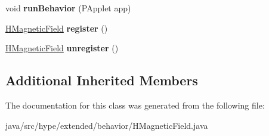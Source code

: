 \begin{DoxyCompactItemize}
\item 
\hypertarget{classhype_1_1extended_1_1behavior_1_1_h_magnetic_field_aa228747ff08e7e9c3382c6382b5a6bd2}{void {\bfseries run\-Behavior} (P\-Applet app)}\label{classhype_1_1extended_1_1behavior_1_1_h_magnetic_field_aa228747ff08e7e9c3382c6382b5a6bd2}

\item 
\hypertarget{classhype_1_1extended_1_1behavior_1_1_h_magnetic_field_a83f23f17e64fd42e8aaccae91dc63b6a}{\hyperlink{classhype_1_1extended_1_1behavior_1_1_h_magnetic_field}{H\-Magnetic\-Field} {\bfseries register} ()}\label{classhype_1_1extended_1_1behavior_1_1_h_magnetic_field_a83f23f17e64fd42e8aaccae91dc63b6a}

\item 
\hypertarget{classhype_1_1extended_1_1behavior_1_1_h_magnetic_field_a6af9c6b98cb6b1afbb63d1d64dc6a993}{\hyperlink{classhype_1_1extended_1_1behavior_1_1_h_magnetic_field}{H\-Magnetic\-Field} {\bfseries unregister} ()}\label{classhype_1_1extended_1_1behavior_1_1_h_magnetic_field_a6af9c6b98cb6b1afbb63d1d64dc6a993}

\end{DoxyCompactItemize}
\subsection*{Additional Inherited Members}


The documentation for this class was generated from the following file\-:\begin{DoxyCompactItemize}
\item 
java/src/hype/extended/behavior/H\-Magnetic\-Field.\-java\end{DoxyCompactItemize}
